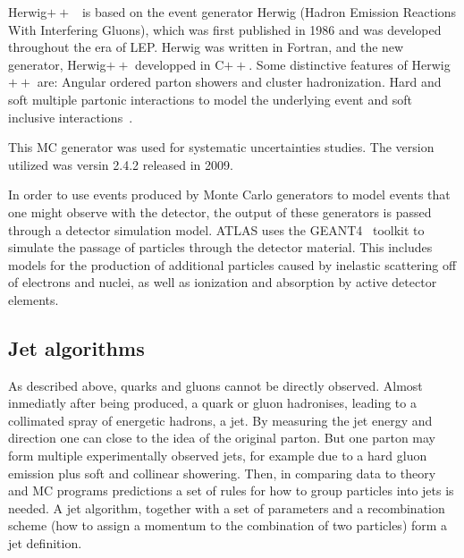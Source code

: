 {\sc Herwig}$++$~\cite{HerwigPP} is based on the event generator {\sc Herwig} (Hadron Emission Reactions With Interfering Gluons), which was first published in 1986 and was developed throughout the era of LEP.  {\sc Herwig} was written in Fortran, and the new generator, Herwig$++$ developped in C$++$. 
Some distinctive features of Herwig$++$ are: Angular ordered parton showers and cluster hadronization.
Hard and soft multiple partonic interactions to model the underlying event and soft inclusive interactions~\cite{1126-6708-2008-07-07}.

This MC generator was used for systematic uncertainties studies. The version utilized was versin 2.4.2 released in 2009. 


In order to use events produced by Monte Carlo generators to model events that one might observe with the detector, the output of these generators is passed through a detector simulation model.  ATLAS uses the GEANT4~\cite{Geant4} toolkit to simulate the passage of particles through the detector material. This includes models for the production of additional particles caused by inelastic scattering off of electrons and nuclei, as well as ionization and absorption by active detector elements.


\subsection{Jet algorithms}


As described above, quarks and gluons cannot be directly observed. Almost inmediatly after being produced, a quark or gluon hadronises, leading to a collimated spray of energetic hadrons, a jet. By measuring the jet energy and direction one can close to the idea of the original parton. But one parton may form multiple experimentally observed jets, for example due to a hard gluon emission plus soft and collinear showering. Then, in comparing data to theory and MC programs predictions a set of rules for how to group particles into jets is needed. A jet algorithm, together with a set of parameters and a recombination scheme (how to assign a momentum to the combination of two particles) form a jet definition.

